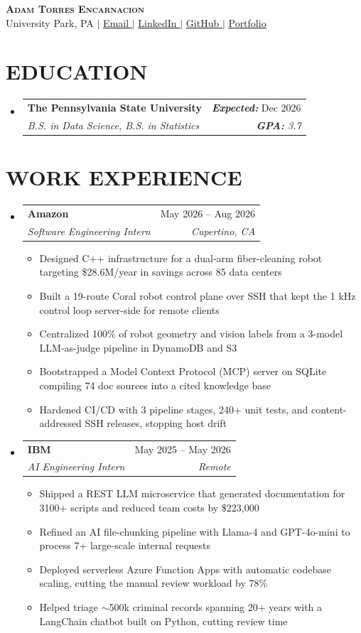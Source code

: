 \documentclass[letterpaper,11pt]{article}
\makeatletter
\newcommand{\resumeItem}[1]{
  \item\small{
    {#1 \vspace{-4pt}}
  }
}
\newcommand{\resumeSubheading}[4]{
  \item
    \begin{tabular*}{0.97\textwidth}[t]{l@{\extracolsep{\fill}}r}
      \textbf{#1} & #2 \\
      \textit{\small#3} & \textit{\small #4} \\
    \end{tabular*}\vspace{-7pt}
}
\newcommand{\resumeSubHeadingListStart}{\begin{itemize}[leftmargin=0.15in, label={}]}
\newcommand{\resumeSubHeadingListEnd}{\end{itemize}}
\newcommand{\resumeItemListStart}{\begin{itemize}}
\newcommand{\resumeItemListEnd}{\end{itemize}\vspace{-6pt}}
\makeatother
\begin{document}
\begin{center}
    \textbf{\Huge \scshape Adam Torres Encarnacion} \\ \vspace{1pt}
    \small University Park, PA $|$ \href{mailto:art5809@psu.edu}{\underline{Email \faEnvelope}} $|$
    \href{https://www.linkedin.com/in/adam-torres-encarnacion/}{\underline{LinkedIn \faLinkedin}} $|$
    \href{https://github.com/0xABAN}{\underline{GitHub \faGithub}} $|$
    \href{https://advm.dev/}{\underline{Portfolio \raisebox{-0.12em}{\scalebox{1.45}{$\blacktriangle$}}}}
\end{center}


\section{\textbf{EDUCATION}}
  \resumeSubHeadingListStart
    \resumeSubheading
    {The Pennsylvania State University}{\textbf{\textit{Expected:}} Dec 2026}
      {B.S. in Data Science, B.S. in Statistics}{\textbf{\textit{GPA:}} 3.7}
  \resumeSubHeadingListEnd

\section{\textbf{WORK EXPERIENCE}}
  \resumeSubHeadingListStart
  \resumeSubheading
      {Amazon}{May 2026 -- Aug 2026}
      {Software Engineering Intern}{Cupertino, CA}
      \resumeItemListStart
        \resumeItem{Designed C++ infrastructure for a dual-arm fiber-cleaning robot targeting \$28.6M/year in savings across 85 data centers}
        \resumeItem{Built a 19-route Coral robot control plane over SSH that kept the 1 kHz control loop server-side for remote clients}
        \resumeItem{Centralized 100\% of robot geometry and vision labels from a 3-model LLM-as-judge pipeline in DynamoDB and S3}
        \resumeItem{Bootstrapped a Model Context Protocol (MCP) server on SQLite compiling 74 doc sources into a cited knowledge base}
        \resumeItem{Hardened CI/CD with 3 pipeline stages, 240+ unit tests, and content-addressed SSH releases, stopping host drift}
      \resumeItemListEnd
    \resumeSubheading
      {IBM}{May 2025 -- May 2026}
      {AI Engineering Intern}{Remote}
      \resumeItemListStart
        \resumeItem{Shipped a REST LLM microservice that generated documentation for 3100+ scripts and reduced team costs by \$223,000}
        \resumeItem{Refined an AI file-chunking pipeline with Llama-4 and GPT-4o-mini to process 7+ large-scale internal requests}
        \resumeItem{Deployed serverless Azure Function Apps with automatic codebase scaling, cutting the manual review workload by 78\%}
        \resumeItem{Helped triage $\sim$500k criminal records spanning 20+ years with a LangChain chatbot built on Python, cutting review time}
      \resumeItemListEnd
  \resumeSubHeadingListEnd
\end{document}
